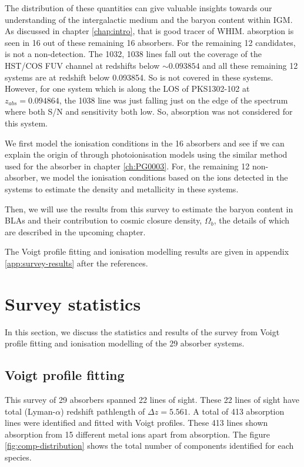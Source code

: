 The distribution of these quantities can give valuable insights towards our understanding of the intergalactic medium and the baryon content within IGM. As discussed in chapter \ref{chap:intro}, that  is good tracer of WHIM.  absorption is seen in 16 out of these remaining 16 absorbers. For the remaining 12 candidates,  is not a non-detection. The  1032, 1038 lines fall out the coverage of the HST/COS FUV channel at redshifts below $\sim 0.093854$ and all these remaining 12 systems are at redshift below 0.093854. So  is not covered in these systems. However, for one system which is along the LOS of PKS1302-102 at $z_{abs}=0.094864$, the  1038 line was just falling just on the edge of the spectrum where both S/N and sensitivity both low. So,  absorption was not considered for this system. 

We first model the ionisation conditions in the 16  absorbers and see if we can explain the origin of  through photoionisation models using the similar method used for the absorber in chapter \ref{ch:PG0003}. For, the remaining 12 non- absorber, we model the ionisation conditions based on the ions detected in the systems to estimate the density and metallicity in these systems. 

Then, we will use the results from this survey to estimate the baryon content in BLAs and their contribution to cosmic closure density, $\Omega_b$, the details of which are described in the upcoming chapter.

The Voigt profile fitting and ionisation modelling results are given in appendix \ref{app:survey-results} after the references.


\section{Survey statistics}

In this section, we discuss the statistics and results of the survey from Voigt profile fitting and ionisation modelling of the 29 absorber systems.

\subsection{Voigt profile fitting}

This survey of 29 absorbers spanned 22 lines of sight. These 22 lines of sight have total  (Lyman-$\alpha$) redshift pathlength of $\Delta z = 5.561$. A total of 413 absorption lines were identified and fitted with Voigt profiles. These 413 lines shown absorption from 15 different metal ions apart from  absorption. The figure \ref{fig:comp-distribution} shows the total number of components identified for each species. 


